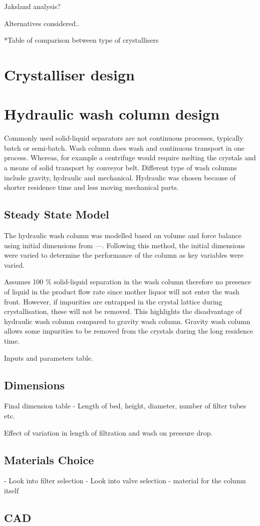 Jaksland analysis?

Alternatives considered..

*Table of comparison between type of crystallisers

 




\section{Crystalliser design}




\section{Hydraulic wash column design}

Commonly used solid-liquid separators are not continuous processes, typically batch or semi-batch. Wash column does wash and continuous transport in one process. Whereas, for example a centrifuge would require  melting the crystals and a means of solid transport by conveyor belt. Different type of wash columns include gravity, hydraulic and mechanical. Hydraulic was chosen because of shorter residence time and less moving mechanical parts. 

\subsection{Steady State Model}
The hydraulic wash column was modelled based on volume and force balance using initial dimensions from ---. Following this method, the initial dimensions were varied to determine the performance of the column as key variables were varied.  

Assumes 100 \% solid-liquid separation in the wash column therefore no presence of liquid in the product flow rate since mother liquor will not enter the wash front. However, if impurities are entrapped in the crystal lattice during crystallisation, these will not be removed. This highlights the disadvantage of hydraulic wash column compared to gravity wash column. Gravity wash column allows some impurities to be removed from the crystals during the long residence time. 

Inputs and parameters table. 

\subsection{Dimensions}
Final dimension table - Length of bed, height, diameter, number of filter tubes etc. 

Effect of variation in length of filtration and wash on pressure drop. 


\subsection{Materials Choice}
- Look into filter selection
- Look into valve selection 
- material for the column itself 

\subsection{CAD}

